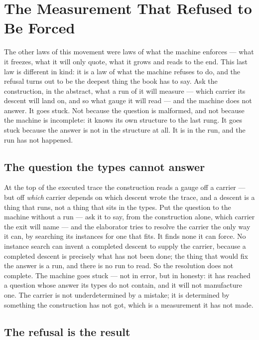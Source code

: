 \chapter{The Measurement That Refused to Be Forced}
\label{chap:measurement-that-refused}

The other laws of this movement were laws of what the machine enforces --- what it freezes, what it will
only quote, what it grows and reads to the end. This last law is different in kind: it is a law of what the
machine refuses to do, and the refusal turns out to be the deepest thing the book has to say. Ask the
construction, in the abstract, what a run of it will measure --- which carrier its descent will land on, and
so what gauge it will read --- and the machine does not answer. It goes stuck. Not because the question is
malformed, and not because the machine is incomplete: it knows its own structure to the last rung. It goes
stuck because the answer is not in the structure at all. It is in the run, and the run has not happened.

\section{The question the types cannot answer}
\label{se:question-types-cannot-answer}

At the top of the executed trace the construction reads a gauge off a carrier --- but off \emph{which}
carrier depends on which descent wrote the trace, and a descent is a thing that runs, not a thing that sits
in the types. Put the question to the machine without a run --- ask it to say, from the construction alone,
which carrier the exit will name --- and the elaborator tries to resolve the carrier the only way it can,
by searching its instances for one that fits. It finds none it can force. No instance search can invent a
completed descent to supply the carrier, because a completed descent is precisely what has not been done;
the thing that would fix the answer is a run, and there is no run to read. So the resolution does not
complete. The machine goes stuck --- not in error, but in honesty: it has reached a question whose answer
its types do not contain, and it will not manufacture one. The carrier is not underdetermined by a mistake;
it is determined by something the construction has not got, which is a measurement it has not made.

\section{The refusal is the result}
\label{se:the-refusal-is-the-result}

